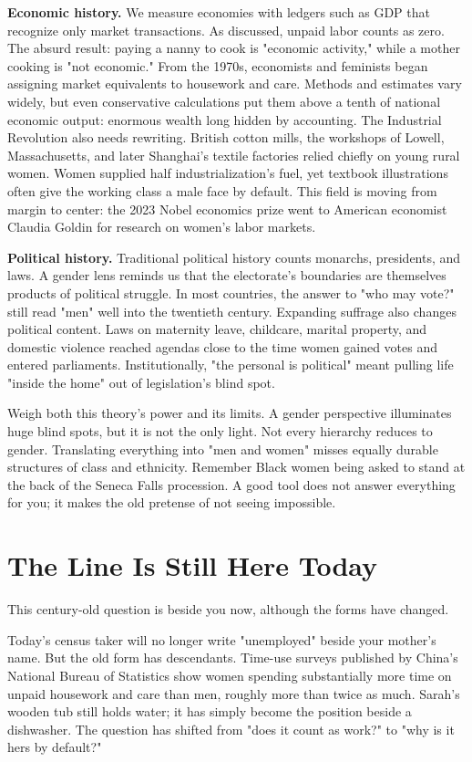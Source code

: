 \textbf{Economic history.} We measure economies with ledgers such as GDP that recognize only market transactions. As discussed, unpaid labor counts as zero. The absurd result: paying a nanny to cook is "economic activity," while a mother cooking is "not economic." From the 1970s, economists and feminists began assigning market equivalents to housework and care. Methods and estimates vary widely, but even conservative calculations put them above a tenth of national economic output: enormous wealth long hidden by accounting. The Industrial Revolution also needs rewriting. British cotton mills, the workshops of Lowell, Massachusetts, and later Shanghai's textile factories relied chiefly on young rural women. Women supplied half industrialization's fuel, yet textbook illustrations often give the working class a male face by default. This field is moving from margin to center: the 2023 Nobel economics prize went to American economist Claudia Goldin for research on women's labor markets.

\textbf{Political history.} Traditional political history counts monarchs, presidents, and laws. A gender lens reminds us that the electorate's boundaries are themselves products of political struggle. In most countries, the answer to "who may vote?" still read "men" well into the twentieth century. Expanding suffrage also changes political content. Laws on maternity leave, childcare, marital property, and domestic violence reached agendas close to the time women gained votes and entered parliaments. Institutionally, "the personal is political" meant pulling life "inside the home" out of legislation's blind spot.

Weigh both this theory's power and its limits. A gender perspective illuminates huge blind spots, but it is not the only light. Not every hierarchy reduces to gender. Translating everything into "men and women" misses equally durable structures of class and ethnicity. Remember Black women being asked to stand at the back of the Seneca Falls procession. A good tool does not answer everything for you; it makes the old pretense of not seeing impossible.

\section{The Line Is Still Here Today}
This century-old question is beside you now, although the forms have changed.

Today's census taker will no longer write "unemployed" beside your mother's name. But the old form has descendants. Time-use surveys published by China's National Bureau of Statistics show women spending substantially more time on unpaid housework and care than men, roughly more than twice as much. Sarah's wooden tub still holds water; it has simply become the position beside a dishwasher. The question has shifted from "does it count as work?" to "why is it hers by default?"

